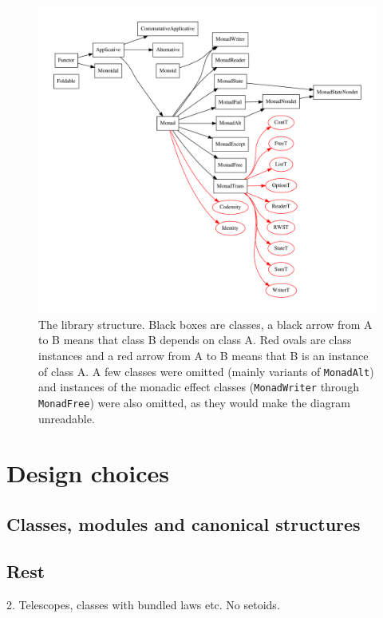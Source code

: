 \documentclass[declaration,inz,english,shortabstract]{iithesis}
\newcommand{\m}[1]{\texttt{#1}}
\begin{document}
\begin{figure}
    \centerline{\includegraphics[width=20cm]{Hierarchy.pdf}}
    \caption{The library structure. Black boxes are classes, a black arrow from A to B means that class B depends on class A. Red ovals are class instances and a red arrow from A to B means that B is an instance of class A. A few classes were omitted (mainly variants of \m{MonadAlt}) and instances of the monadic effect classes (\m{MonadWriter} through \m{MonadFree}) were also omitted, as they would make the diagram unreadable.}
    \label{fig:hierarchy}
\end{figure}

\section{Design choices}

\subsection{Classes, modules and canonical structures}



\subsection{Rest}

2. Telescopes, classes with bundled laws etc. No setoids.
\end{document}
